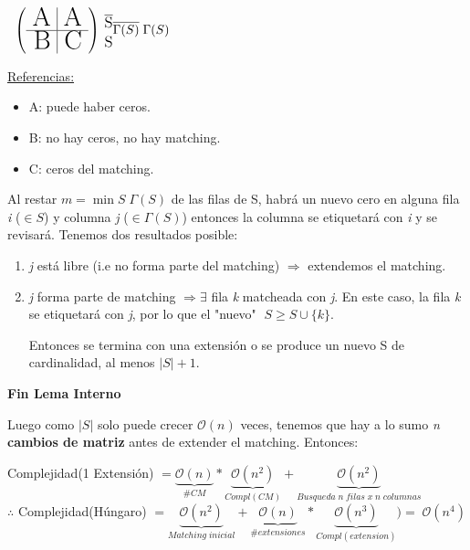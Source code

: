 \documentclass[12pt,a4paper]{report}
\begin{document}
\begin{enumerate}
				\begin{center}$
				\; \; \left(
				\begin{array}{r | r}
					\text{{\huge A}} & \text{{\huge A}} \\
					\hline
					\text{{\huge B}} & \text{{\huge C}}
				\end{array}
				\right)
				{\begin{subarray}{l} \; \overline{\text{{\large S}}} \\ \\ \; {\text{{\large S}}} \end{subarray}} \linebreak
				\overline{\Gamma(S)} \; \Gamma(S)
				$
				\end{center}
				
				\underline{Referencias:}
				\begin{itemize}
					\item A: puede haber ceros.
					\item B: no hay ceros, no hay matching.
					\item C: ceros del matching.
				\end{itemize}
				
				Al restar $\textit{m} = \min S \; \Gamma(S)$ de las filas de S, habrá un nuevo cero en alguna fila \textit{i} ($\in S$) y columna \textit{j} ($\in \Gamma(S)$) entonces la columna se etiquetará con \textit{i} y se revisará.
				Tenemos dos resultados posible:
				\begin{enumerate}
					\item \textit{j} está libre (i.e no forma parte del matching) $\Rightarrow$ extendemos el matching.
					\item \textit{j} forma parte de matching $\Rightarrow \exists$ fila \textit{k} matcheada con \textit{j}. En este caso, la fila \textit{k} se etiquetará con \textit{j}, por lo que el "nuevo" $\; S \geq S \cup \{\textit{k}\}$.
					
					\vspace{5mm}
					Entonces se termina con una extensión o se produce un nuevo S de cardinalidad, al menos $\lvert S \rvert + 1$.
				\end{enumerate}
				
				\textbf{Fin Lema Interno}
				
				Luego como $\lvert S \rvert$ solo puede crecer $\mathcal{O}(n)$ veces, tenemos que hay a lo sumo \textit{n} \textbf{cambios de matriz} antes de extender el matching. Entonces:
				
							\begin{center}
								Complejidad(1 Extensión) $= \underbrace{\mathcal{O}(n)}_{\# CM} * \underbrace{\mathcal{O}(n^{2})}_{Compl(CM)} + \underbrace{\mathcal{O}(n^{2})}_{Busqueda \; \textit{n} \; filas \; x \; \textit{n} \; columnas }$ \\
								\vspace{5mm}
								$\therefore$ Complejidad(Húngaro) $= \underbrace{\mathcal{O}(n^{2})}_{Matching \; inicial} + \underbrace{\mathcal{O}(n)}_{\#extensiones} * \underbrace{\mathcal{O}(n^{3})}_{Compl(extension)}) = \; \mathcal{O}(n^{4})$
							\end{center}				
			\end{enumerate}
	
\end{document}
